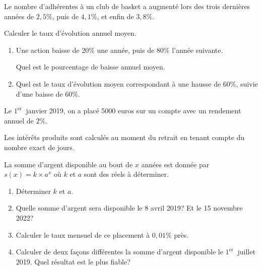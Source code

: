 \documentclass[french]{book}
\begin{document}
\begin{exocor}

Le nombre d'adhérentes à un club de basket a augmenté lors des trois dernières années de $2,5 \%$, puis de $4,1 \%$, et enfin de $3,8 \%$.

Calculer le taux d'évolution annuel moyen.

\end{exocor}

\begin{exocor}
\begin{enumerate}
\item Une action baisse de $20 \%$ une année, puis de $80 \%$ l'année suivante.

Quel est le pourcentage de baisse annuel moyen.

\item Quel est le taux d'évolution moyen correspondant à une hausse de $60 \%$, suivie d'une baisse de $60 \%$.
\end{enumerate}
\end{exocor}



\begin{exocor}
Le $1^{\text {er }}$ janvier 2019, on a placé 5000 euros sur un compte avec un rendement annuel de $2 \%$.

Les intérêts produits sont calculés au moment du retrait en tenant compte du nombre exact de jours.

La somme d'argent disponible au bout de $x$ années est donnée par $s(x)=k \times a^{x}$ où $k$ et $a$ sont des réels à déterminer.

\begin{enumerate}
\item Déterminer $k$ et $a$.

\item Quelle somme d'argent sera disponible le 8 avril 2019? Et le 15 novembre 2022?

\item Calculer le taux mensuel de ce placement à $0,01 \%$ près.

\item Calculer de deux façons différentes la somme d'argent disponible le $1^{\text {er }}$ juillet 2019. Quel résultat est le plus fiable?
\end{enumerate}
\end{exocor}
\end{document}
